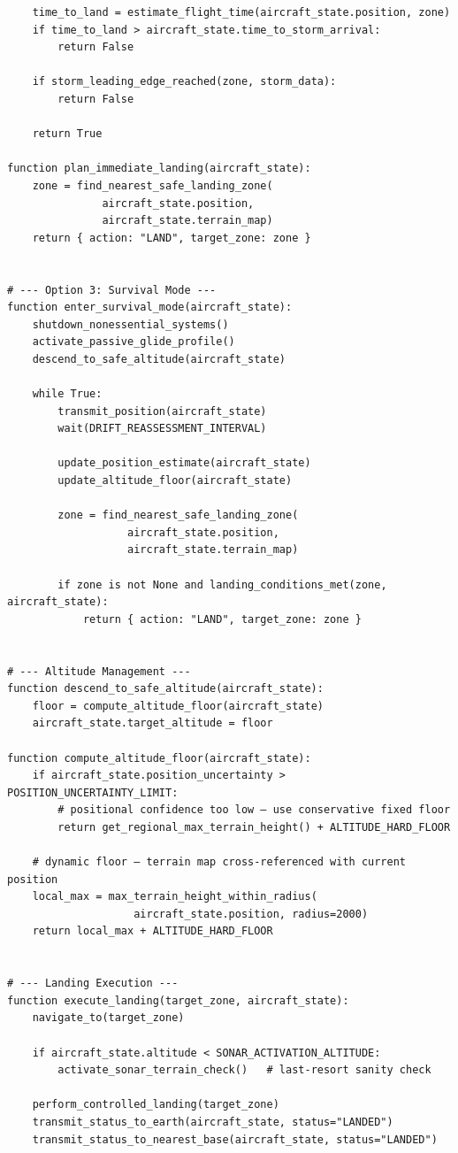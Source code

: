 \documentclass[a4paper,12pt]{article}
\begin{document}
\begin{verbatim}
    time_to_land = estimate_flight_time(aircraft_state.position, zone)
    if time_to_land > aircraft_state.time_to_storm_arrival:
        return False

    if storm_leading_edge_reached(zone, storm_data):
        return False

    return True

function plan_immediate_landing(aircraft_state):
    zone = find_nearest_safe_landing_zone(
               aircraft_state.position,
               aircraft_state.terrain_map)
    return { action: "LAND", target_zone: zone }


# --- Option 3: Survival Mode ---
function enter_survival_mode(aircraft_state):
    shutdown_nonessential_systems()
    activate_passive_glide_profile()
    descend_to_safe_altitude(aircraft_state)

    while True:
        transmit_position(aircraft_state)
        wait(DRIFT_REASSESSMENT_INTERVAL)

        update_position_estimate(aircraft_state)
        update_altitude_floor(aircraft_state)

        zone = find_nearest_safe_landing_zone(
                   aircraft_state.position,
                   aircraft_state.terrain_map)

        if zone is not None and landing_conditions_met(zone, aircraft_state):
            return { action: "LAND", target_zone: zone }


# --- Altitude Management ---
function descend_to_safe_altitude(aircraft_state):
    floor = compute_altitude_floor(aircraft_state)
    aircraft_state.target_altitude = floor

function compute_altitude_floor(aircraft_state):
    if aircraft_state.position_uncertainty > POSITION_UNCERTAINTY_LIMIT:
        # positional confidence too low — use conservative fixed floor
        return get_regional_max_terrain_height() + ALTITUDE_HARD_FLOOR

    # dynamic floor — terrain map cross-referenced with current position
    local_max = max_terrain_height_within_radius(
                    aircraft_state.position, radius=2000)
    return local_max + ALTITUDE_HARD_FLOOR


# --- Landing Execution ---
function execute_landing(target_zone, aircraft_state):
    navigate_to(target_zone)

    if aircraft_state.altitude < SONAR_ACTIVATION_ALTITUDE:
        activate_sonar_terrain_check()   # last-resort sanity check

    perform_controlled_landing(target_zone)
    transmit_status_to_earth(aircraft_state, status="LANDED")
    transmit_status_to_nearest_base(aircraft_state, status="LANDED")
\end{verbatim}
\end{document}
